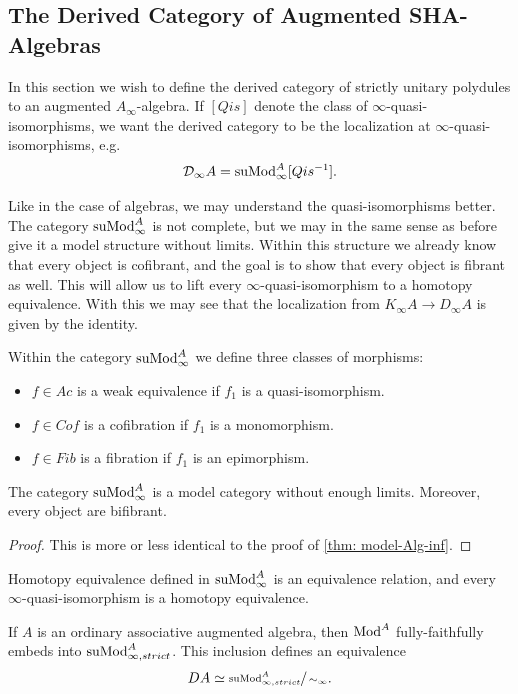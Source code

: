 \documentclass[../thesis.tex]{subfiles}
\begin{document}
        \subsection{The Derived Category of Augmented SHA-Algebras} 

            In this section we wish to define the derived category of strictly unitary polydules to an augmented $A_\infty$-algebra. If $[Qis]$ denote the class of $\infty$-quasi-isomorphisms, we want the derived category to be the localization at $\infty$-quasi-isomorphisms, e.g.
            \begin{align*}
                \mathcal{D}_\infty A = \tt{suMod}_\infty^A[Qis^{-1}].
            \end{align*}

            Like in the case of algebras, we may understand the quasi-isomorphisms better. The category $\tt{suMod}_\infty^A$ is not complete, but we may in the same sense as before give it a model structure without limits. Within this structure we already know that every object is cofibrant, and the goal is to show that every object is fibrant as well. This will allow us to lift every $\infty$-quasi-isomorphism to a homotopy equivalence. With this we may see that the localization from $K_\infty A \to D_\infty A$ is given by the identity.

            Within the category $\tt{suMod}_\infty^A$ we define three classes of morphisms:
            \begin{itemize}
                \item $f\in Ac$ is a weak equivalence if $f_1$ is a quasi-isomorphism.
                \item $f\in Cof$ is a cofibration if $f_1$ is a monomorphism.
                \item $f\in Fib$ is a fibration if $f_1$ is an epimorphism.
            \end{itemize}

            \begin{thm}
                The category $\tt{suMod}_\infty^A$ is a model category without enough limits. Moreover, every object are bifibrant.
            \end{thm}

            \begin{proof}
                This is more or less identical to the proof of \ref{thm: model-Alg-inf}.
            \end{proof}

            \begin{corollary}
                Homotopy equivalence defined in $\tt{suMod}_\infty^A$ is an equivalence relation, and every $\infty$-quasi-isomorphism is a homotopy equivalence.

                If $A$ is an ordinary associative augmented algebra, then $\tt{Mod}^A$ fully-faithfully embeds into $\tt{suMod}_{\infty,strict}^A$. This inclusion defines an equivalence
                \begin{align*}
                    DA \simeq \sfrac{\tt{suMod}^A_{\infty, strict}}{\sim_\infty}\tt{.}
                \end{align*}
            \end{corollary}
\end{document}
